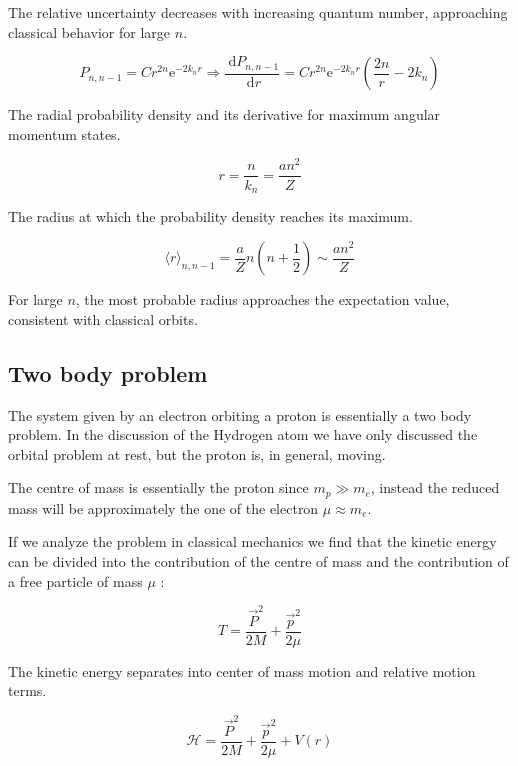 \documentclass[italian]{HKNdocument}
\begin{document}
The relative uncertainty decreases with increasing quantum number, approaching classical behavior for large $n$.

\begin{equation}
P_{n, n-1}=C r^{2 n} \mathrm{e}^{-2 k_{n} r} \Longrightarrow \frac{\mathrm{~d} P_{n, n-1}}{\mathrm{~d} r}=C r^{2 n} \mathrm{e}^{-2 k_{n} r}\left(\frac{2 n}{r}-2 k_{n}\right) \label{eq:9.105}
\end{equation}

The radial probability density and its derivative for maximum angular momentum states.

\begin{equation}
r=\frac{n}{k_{n}}=\frac{a n^{2}}{Z} \label{eq:9.106}
\end{equation}

The radius at which the probability density reaches its maximum.

\begin{equation}
\langle r\rangle_{n, n-1}=\frac{a}{Z} n\left(n+\frac{1}{2}\right) \sim \frac{a n^{2}}{Z} \label{eq:9.107}
\end{equation}

For large $n$, the most probable radius approaches the expectation value, consistent with classical orbits.

\subsection{Two body problem}
The system given by an electron orbiting a proton is essentially a two body problem. In the discussion of the Hydrogen atom we have only discussed the orbital problem at rest, but the proton is, in general, moving.

The centre of mass is essentially the proton since $m_{p} \gg m_{e}$, instead the reduced mass will be approximately the one of the electron $\mu \approx m_{e}$.

If we analyze the problem in classical mechanics we find that the kinetic energy can be divided into the contribution of the centre of mass and the contribution of a free particle of mass $\mu$ :

\begin{equation}
T=\frac{\vec{P}^{2}}{2 M}+\frac{\vec{p}^{2}}{2 \mu} \label{eq:9.108}
\end{equation}

The kinetic energy separates into center of mass motion and relative motion terms.

\begin{equation}
\mathcal{H}=\frac{\vec{P}^{2}}{2 M}+\frac{\vec{p}^{2}}{2 \mu}+V(r) \label{eq:9.109}
\end{equation}
\end{document}

